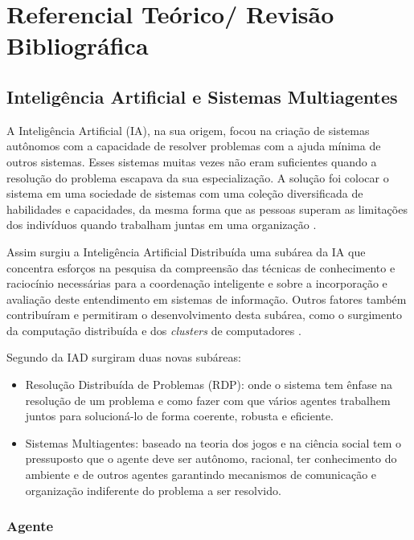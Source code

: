 \chapter{Referencial Teórico/ Revisão Bibliográfica}

\section{Inteligência Artificial e Sistemas Multiagentes}

A Inteligência Artificial (IA), na sua origem, focou na criação de sistemas autônomos com a capacidade de resolver problemas com a ajuda mínima de outros sistemas. Esses sistemas muitas vezes não eram suficientes quando a resolução do problema escapava da sua especialização. A solução foi colocar o sistema em uma sociedade de sistemas com uma coleção diversificada de habilidades e capacidades, da mesma forma que as pessoas superam as limitações dos indivíduos quando trabalham juntas em uma organização \cite{durfee1991distributed}. 

Assim surgiu a Inteligência Artificial Distribuída uma subárea da IA que concentra esforços na pesquisa da compreensão das técnicas de conhecimento e raciocínio necessárias para a coordenação inteligente e sobre a incorporação e avaliação deste entendimento em sistemas de informação. Outros fatores também contribuíram e permitiram o desenvolvimento desta subárea, como o surgimento da computação distribuída e dos \textit{clusters} de computadores \cite{durfee1991distributed,bond2014readings}.

Segundo \cite{durfee1994distributed} da IAD surgiram duas novas subáreas:

\begin{itemize}
\item Resolução Distribuída de Problemas (RDP): onde o sistema tem ênfase na resolução de um problema e como fazer com que vários agentes trabalhem juntos para solucioná-lo de forma coerente, robusta e eficiente.

\item Sistemas Multiagentes: baseado na teoria dos jogos e na ciência social tem o pressuposto que o agente deve ser autônomo, racional, ter conhecimento do ambiente e de outros agentes garantindo mecanismos de comunicação e organização indiferente do problema a ser resolvido.
\end{itemize}

\subsection{Agente}

